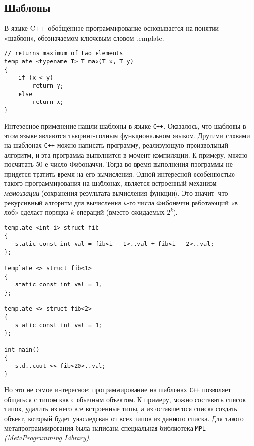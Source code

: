\documentclass[a4paper,10pt]{article}
\begin{document}
\subsection{Шаблоны}
В языке C++ обобщённое программирование основывается на понятии «шаблон», обозначаемом ключевым словом template.
{\small \begin{lstlisting}
// returns maximum of two elements
template <typename T> T max(T x, T y)
{
    if (x < y)
        return y;
    else
        return x;
}
\end{lstlisting}}

Интересное применение нашли шаблоны в языке {\tt C++}. Оказалось, что шаблоны в этом языке являются тьюринг-полным функциональном языком. Другими
словами на шаблонах {\tt С++} можно написать программу, реализующую произвольный алгоритм, и эта программа выполнится в момент компиляции. К
примеру, можно посчитать  50-е число Фибоначчи. Тогда во время выполнения программы не придется тратить время на его вычисления. Одной
интересной особенностью такого программирования на шаблонах, является встроенный механизм {\it мемоизации} (сохранения результата вычисления
функции). Это значит, что рекурсивный алгоритм для вычисления $k$-го числа Фибоначчи работающий «в лоб» сделает порядка $k$ операций (вместо
ожидаемых $2^k$). 
{\small \begin{lstlisting}
template <int i> struct fib
{
   static const int val = fib<i - 1>::val + fib<i - 2>::val;
};

template <> struct fib<1>
{
   static const int val = 1;
};

template <> struct fib<2>
{
   static const int val = 1;
};

int main()
{
   std::cout << fib<20>::val;
}
\end{lstlisting}}

Но это не самое интересное: программирование на шаблонах {\tt С++} позволяет общаться с типом как с обычным объектом. К примеру,
можно составить список типов, удалить из него все встроенные типы, а из оставшегося списка создать объект, который будет унаследован от всех
типов из данного списка. Для такого метапрограммирования была написана специальная библиотека {\tt MPL} {\it (MetaProgramming Library)}.
\end{document}

